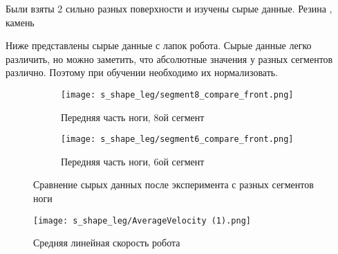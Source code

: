Были взяты 2 сильно разных поверхности и изучены сырые данные. Резина   \quad {} \quad, камень  \quad {} 


Ниже  представлены сырые данные с лапок робота. Сырые данные легко различить, но можно заметить, что абсолютные значения у разных сегментов различно. Поэтому при обучении необходимо их нормализовать.

\begin{figure}[H]
    \begin{subfigure}[t]{0.9\textwidth}
        \centering\texttt{[image: s\_shape\_leg/segment8\_compare\_front.png]}
        \caption{Передняя часть ноги, 8ой сегмент}
    \end{subfigure}

    \begin{subfigure}[t]{0.9\textwidth}
        \centering\texttt{[image: s\_shape\_leg/segment6\_compare\_front.png]}
        \caption{Передняя часть ноги, 6ой сегмент}
    \end{subfigure}
    \caption{Сравнение сырых данных после эксперимента с разных сегментов ноги}
    \label{fig:data_from_legs}
\end{figure}

\begin{figure}[H]
    \centering\texttt{[image: s\_shape\_leg/AverageVelocity (1).png]}
    \caption{Средняя линейная скорость робота}
    \label{fig:s_shape_leg/AverageVelocity (1).png}
\end{figure}

